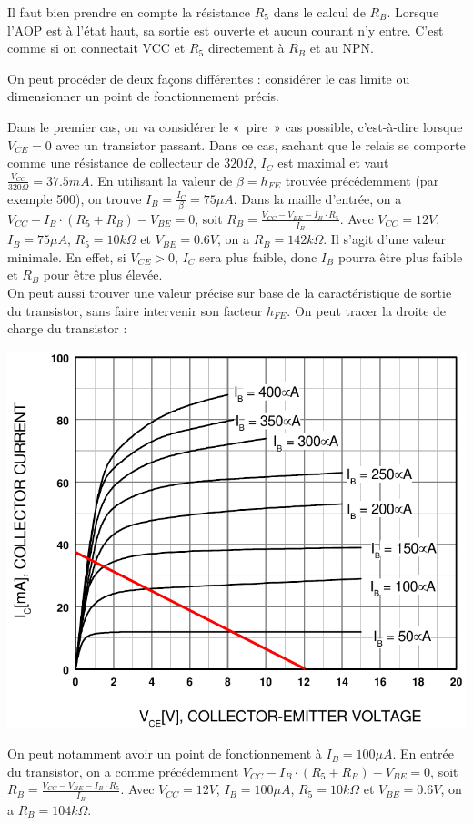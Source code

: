 \documentclass{../../template/labo}
\begin{document}
{
	Il faut bien prendre en compte la résistance $R_5$ dans le calcul de $R_B$. Lorsque l'AOP est à l'état haut, sa sortie est ouverte et aucun courant n'y entre. C'est comme si on connectait VCC et $R_5$ directement à $R_B$ et au NPN.

	On peut procéder de deux façons différentes : considérer le cas limite ou dimensionner un point de fonctionnement précis.

	Dans le premier cas, on va considérer le «~pire~» cas possible, c'est-à-dire lorsque $V_{CE} = 0$ avec un transistor passant. Dans ce cas, sachant que le relais se comporte comme une résistance de collecteur de $320 \Omega$, $I_C$ est maximal et vaut $\frac{V_{CC}}{320 \Omega} = 37.5 mA$.
	En utilisant la valeur de $\beta = h_{FE}$ trouvée précédemment (par exemple 500), on trouve $I_B = \frac{I_C}{\beta} = 75 \mu A$.
	Dans la maille d'entrée, on a $V_{CC} - I_B \cdot (R_5 + R_B) - V_{BE} = 0$, soit $R_B = \frac{V_{CC} - V_{BE} - I_B\cdot R_5}{I_B}$. Avec $V_{CC} = 12 V$, $I_B = 75 \mu A$, $R_5 = 10k\Omega$ et $V_{BE} = 0.6 V$, on a $R_B = 142k\Omega$.
	Il s'agit d'une valeur minimale. En effet, si $V_{CE} > 0$, $I_C$ sera plus faible, donc $I_B$ pourra être plus faible et $R_B$ pour être plus élevée.\\

	On peut aussi trouver une valeur précise sur base de la caractéristique de sortie du transistor, sans faire intervenir son facteur $h_{FE}$.
	On peut tracer la droite de charge du transistor :
	\begin{center}
		\includegraphics[width=.7\textwidth]{BC546-output-carac.png}
	\end{center}

	On peut notamment avoir un point de fonctionnement à $I_B = 100\mu A$.
	En entrée du transistor, on a comme précédemment $V_{CC} - I_B \cdot (R_5 + R_B) - V_{BE} = 0$, soit $R_B = \frac{V_{CC} - V_{BE} - I_B\cdot R_5}{I_B}$. Avec $V_{CC} = 12 V$, $I_B = 100 \mu A$, $R_5 = 10k\Omega$ et $V_{BE} = 0.6 V$, on a $R_B = 104k\Omega$.

}
\end{document}
